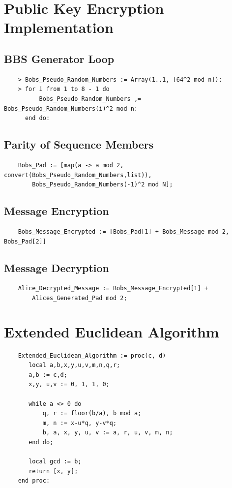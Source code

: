 \documentclass{article}
\begin{document}
\newpage


\newpage
\appendix

\section{Public Key Encryption Implementation}
\subsection{BBS Generator Loop}
\begin{verbatim}
    > Bobs_Pseudo_Random_Numbers := Array(1..1, [64^2 mod n]):
    > for i from 1 to 8 - 1 do
          Bobs_Pseudo_Random_Numbers ,= Bobs_Pseudo_Random_Numbers(i)^2 mod n:
      end do:
\end{verbatim}

\subsection{Parity of Sequence Members}
\begin{verbatim}
    Bobs_Pad := [map(a -> a mod 2, convert(Bobs_Pseudo_Random_Numbers,list)),                
        Bobs_Pseudo_Random_Numbers(-1)^2 mod N];
\end{verbatim}

\subsection{Message Encryption}
\begin{verbatim}
    Bobs_Message_Encrypted := [Bobs_Pad[1] + Bobs_Message mod 2, Bobs_Pad[2]]
\end{verbatim}

\subsection{Message Decryption}
\begin{verbatim}
    Alice_Decrypted_Message := Bobs_Message_Encrypted[1] + 
        Alices_Generated_Pad mod 2;
\end{verbatim}

\section{Extended Euclidean Algorithm}

\begin{verbatim}
    Extended_Euclidean_Algorithm := proc(c, d)
       local a,b,x,y,u,v,m,n,q,r;
       a,b := c,d;
       x,y, u,v := 0, 1, 1, 0;

       while a <> 0 do
           q, r := floor(b/a), b mod a;
           m, n := x-u*q, y-v*q;
           b, a, x, y, u, v := a, r, u, v, m, n;
       end do;

       local gcd := b;
       return [x, y];
    end proc:
\end{verbatim}
\end{document}
